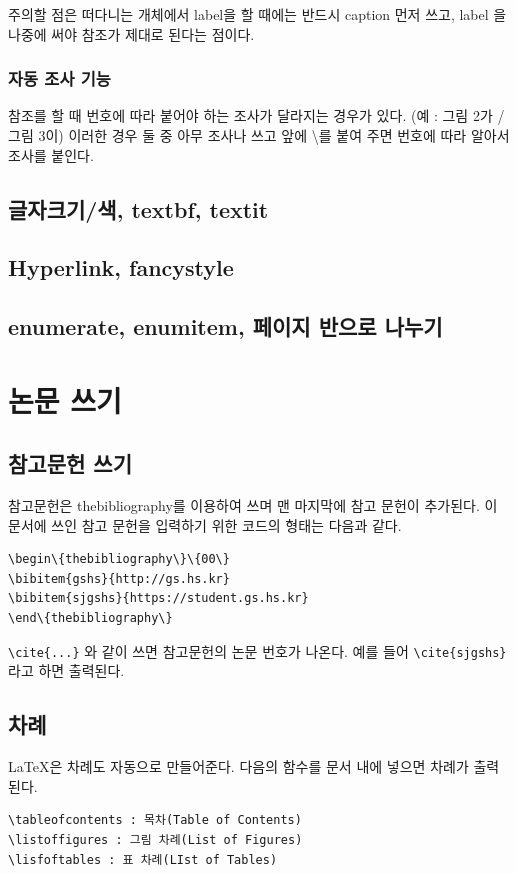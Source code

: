 \documentclass[11pt]{article}
\begin{document}
주의할 점은 떠다니는 개체에서 label을 할 때에는 반드시 caption 먼저 쓰고, label 
을 나중에 써야 참조가 제대로 된다는 점이다.

\subsubsection{자동 조사 기능}
참조를 할 때 번호에 따라 붙어야 하는 조사가 달라지는 경우가 있다. (예 : 그림 
2가 / 그림 3이) 이러한 경우 둘 중 아무 조사나 쓰고 앞에 \textbackslash 를 붙여 
주면 번호에 따라 알아서 조사를 붙인다.

\subsection{글자크기/색, textbf, textit}
\subsection{Hyperlink, fancystyle}

\subsection{enumerate, enumitem, 페이지 반으로 나누기}

\section{논문 쓰기}

\subsection{참고문헌 쓰기}
참고문헌은 thebibliography를 이용하여 쓰며 맨 마지막에 참고 문헌이 추가된다. 
이 문서에 쓰인 참고 문헌을 입력하기 위한 코드의 형태는 다음과 같다.
\begin{verbatim}
\begin\{thebibliography\}\{00\}
\bibitem{gshs}{http://gs.hs.kr}
\bibitem{sjgshs}{https://student.gs.hs.kr}
\end\{thebibliography\}
\end{verbatim}
\verb|\cite{...}| 와 같이 쓰면 참고문헌의 논문 번호가 나온다. 예를 들어
\verb|\cite{sjgshs}|라고 하면 \cite{sjgshs}\이 출력된다.


\subsection{차례}
\LaTeX 은 차례도 자동으로 만들어준다. 다음의 함수를 문서 내에 넣으면 차례가 
출력된다.

\begin{verbatim}
\tableofcontents : 목차(Table of Contents)	
\listoffigures : 그림 차례(List of Figures)
\lisfoftables : 표 차례(LIst of Tables)
\end{verbatim}
\end{document}
